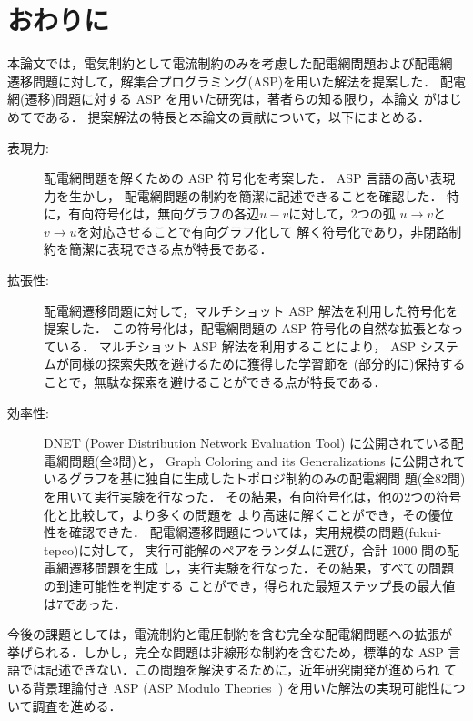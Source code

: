 ﻿\section{おわりに}\label{chap:conc}

本論文では，電気制約として電流制約のみを考慮した配電網問題および配電網
遷移問題に対して，解集合プログラミング(ASP)を用いた解法を提案した．
配電網(遷移)問題に対する ASP を用いた研究は，著者らの知る限り，本論文
がはじめてである．
提案解法の特長と本論文の貢献について，以下にまとめる．

\begin{description}
\item[表現力:]
  配電網問題を解くための ASP 符号化を考案した．
  ASP 言語の高い表現力を生かし，
  配電網問題の制約を簡潔に記述できることを確認した．
  特に，有向符号化は，無向グラフの各辺$u-v$に対して，2つの弧
  $u\rightarrow v$と$v\rightarrow u$を対応させることで有向グラフ化して
  解く符号化であり，非閉路制約を簡潔に表現できる点が特長である．
\item[拡張性:]
  配電網遷移問題に対して，マルチショット ASP 解法を利用した符号化を提案した．
  この符号化は，配電網問題の ASP 符号化の自然な拡張となっている．
  マルチショット ASP 解法を利用することにより，
  ASP システムが同様の探索失敗を避けるために獲得した学習節を
  (部分的に)保持することで，無駄な探索を避けることができる点が特長である．
\item[効率性:]
  DNET (Power Distribution Network Evaluation Tool)
  に公開されている配電網問題(全3問)と，
  Graph Coloring and its Generalizations
  に公開されているグラフを基に独自に生成したトポロジ制約のみの配電網問
  題(全82問)を用いて実行実験を行なった．
  その結果，有向符号化は，他の2つの符号化と比較して，より多くの問題を
  より高速に解くことができ，その優位性を確認できた．
  配電網遷移問題については，実用規模の問題({\sf fukui-tepco})に対して，
  実行可能解のペアをランダムに選び，合計 1000 問の配電網遷移問題を生成
  し，実行実験を行なった．その結果，すべての問題の到達可能性を判定する
  ことができ，得られた最短ステップ長の最大値は7であった．
\end{description}

今後の課題としては，電流制約と電圧制約を含む完全な配電網問題への拡張が
挙げられる．しかし，完全な問題は非線形な制約を含むため，標準的な ASP
言語では記述できない．この問題を解決するために，近年研究開発が進められ
ている背景理論付き ASP (ASP Modulo Theories~\cite{DBLP:conf/iclp/GebserKKOSW16}) 
を用いた解法の実現可能性について調査を進める．

